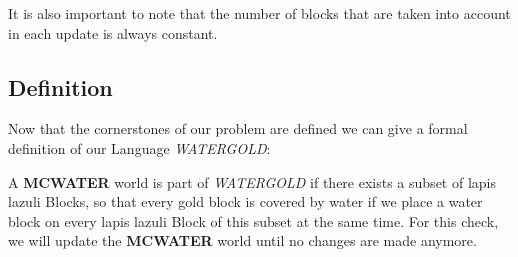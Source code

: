 \noindent It is also important to note that the number of blocks that are taken into account in each update is always constant.

\subsection{Definition}

Now that the cornerstones of our problem are defined we can give a formal definition of our Language \textit{WATERGOLD}:

\noindent A \textbf{MCWATER} world is part of \textit{WATERGOLD} if there exists a subset of lapis lazuli Blocks, so that every gold block is covered by water if we place a water block on every lapis lazuli Block of this subset at the same time. For this check, we will update the \textbf{MCWATER} world until no changes are made anymore.

